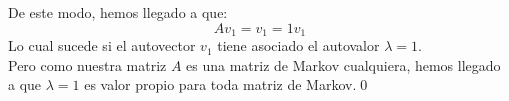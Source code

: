 	De este modo, hemos llegado a que:
	\[Av_1=v_1=1v_1\]
	Lo cual sucede si el autovector $v_1$ tiene asociado el autovalor $\lambda=1$.\\
	Pero como nuestra matriz $A$ es una matriz de Markov cualquiera, hemos llegado a que $\lambda=1$ es valor propio para toda matriz de Markov.\qed
	

